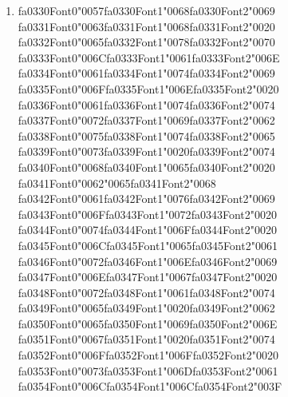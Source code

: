 \documentclass[12pt]{article}
\begin{document}
\begin{enumerate}[label=Q\arabic*.]
 \item {\csname fa0330Font0\endcsname\char"0057}{\csname fa0330Font1\endcsname\char"0068}{\csname fa0330Font2\endcsname\char"0069} {\csname fa0331Font0\endcsname\char"0063}{\csname fa0331Font1\endcsname\char"0068}{\csname fa0331Font2\endcsname\char"0020} {\csname fa0332Font0\endcsname\char"0065}{\csname fa0332Font1\endcsname\char"0078}{\csname fa0332Font2\endcsname\char"0070} {\csname fa0333Font0\endcsname\char"006C}{\csname fa0333Font1\endcsname\char"0061}{\csname fa0333Font2\endcsname\char"006E} {\csname fa0334Font0\endcsname\char"0061}{\csname fa0334Font1\endcsname\char"0074}{\csname fa0334Font2\endcsname\char"0069} {\csname fa0335Font0\endcsname\char"006F}{\csname fa0335Font1\endcsname\char"006E}{\csname fa0335Font2\endcsname\char"0020} {\csname fa0336Font0\endcsname\char"0061}{\csname fa0336Font1\endcsname\char"0074}{\csname fa0336Font2\endcsname\char"0074} {\csname fa0337Font0\endcsname\char"0072}{\csname fa0337Font1\endcsname\char"0069}{\csname fa0337Font2\endcsname\char"0062} {\csname fa0338Font0\endcsname\char"0075}{\csname fa0338Font1\endcsname\char"0074}{\csname fa0338Font2\endcsname\char"0065} {\csname fa0339Font0\endcsname\char"0073}{\csname fa0339Font1\endcsname\char"0020}{\csname fa0339Font2\endcsname\char"0074} {\csname fa0340Font0\endcsname\char"0068}{\csname fa0340Font1\endcsname\char"0065}{\csname fa0340Font2\endcsname\char"0020} {\csname fa0341Font0\endcsname\char"0062}{\char"0065}{\csname fa0341Font2\endcsname\char"0068} {\csname fa0342Font0\endcsname\char"0061}{\csname fa0342Font1\endcsname\char"0076}{\csname fa0342Font2\endcsname\char"0069} {\csname fa0343Font0\endcsname\char"006F}{\csname fa0343Font1\endcsname\char"0072}{\csname fa0343Font2\endcsname\char"0020} {\csname fa0344Font0\endcsname\char"0074}{\csname fa0344Font1\endcsname\char"006F}{\csname fa0344Font2\endcsname\char"0020} {\csname fa0345Font0\endcsname\char"006C}{\csname fa0345Font1\endcsname\char"0065}{\csname fa0345Font2\endcsname\char"0061} {\csname fa0346Font0\endcsname\char"0072}{\csname fa0346Font1\endcsname\char"006E}{\csname fa0346Font2\endcsname\char"0069} {\csname fa0347Font0\endcsname\char"006E}{\csname fa0347Font1\endcsname\char"0067}{\csname fa0347Font2\endcsname\char"0020} {\csname fa0348Font0\endcsname\char"0072}{\csname fa0348Font1\endcsname\char"0061}{\csname fa0348Font2\endcsname\char"0074} {\csname fa0349Font0\endcsname\char"0065}{\csname fa0349Font1\endcsname\char"0020}{\csname fa0349Font2\endcsname\char"0062} {\csname fa0350Font0\endcsname\char"0065}{\csname fa0350Font1\endcsname\char"0069}{\csname fa0350Font2\endcsname\char"006E} {\csname fa0351Font0\endcsname\char"0067}{\csname fa0351Font1\endcsname\char"0020}{\csname fa0351Font2\endcsname\char"0074} {\csname fa0352Font0\endcsname\char"006F}{\csname fa0352Font1\endcsname\char"006F}{\csname fa0352Font2\endcsname\char"0020} {\csname fa0353Font0\endcsname\char"0073}{\csname fa0353Font1\endcsname\char"006D}{\csname fa0353Font2\endcsname\char"0061} {\csname fa0354Font0\endcsname\char"006C}{\csname fa0354Font1\endcsname\char"006C}{\csname fa0354Font2\endcsname\char"003F}

\end{enumerate}
\end{document}
